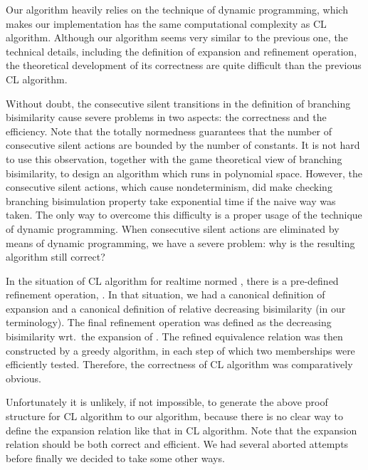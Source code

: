 \documentclass{llncs}
\begin{document}
Our algorithm heavily relies on the technique of dynamic programming, which makes our implementation has the same computational complexity as CL algorithm.   Although our algorithm seems very similar to the previous one,  the technical details, including the definition of expansion and refinement operation, the theoretical development of its correctness are quite difficult than the previous CL algorithm.


Without doubt, the consecutive silent transitions in the definition of branching bisimilarity cause severe problems in two aspects: the correctness and the efficiency. Note that the totally normedness guarantees that the number of consecutive silent actions are bounded by the number of constants. It is not hard to use this observation, together with the game theoretical view of branching bisimilarity, to design an algorithm which runs in polynomial space.   However, the consecutive silent actions, which cause nondeterminism, did make checking branching bisimulation property take exponential time if the naive way was taken.  The only way to overcome this difficulty is a proper usage of the technique of dynamic programming.  When consecutive silent actions are eliminated by means of dynamic programming, we have a severe problem: why is the resulting algorithm still correct?

In the situation of CL algorithm for realtime normed , there is a pre-defined refinement operation, . In that situation, we had a canonical definition of expansion and a canonical definition of relative decreasing bisimilarity (in our terminology). The final refinement operation  was defined as the decreasing bisimilarity wrt.~the expansion of .  The refined equivalence relation was then constructed by a greedy algorithm, in each step of which two memberships were efficiently tested.  Therefore, the correctness of CL algorithm was comparatively obvious.

Unfortunately it is unlikely, if not impossible, to generate the above proof structure for CL algorithm to our algorithm, because there is no clear way to define the expansion relation like that in CL algorithm. Note that the expansion relation should be both correct and efficient. We had several aborted attempts before finally we decided to take some other ways.
\end{document}
